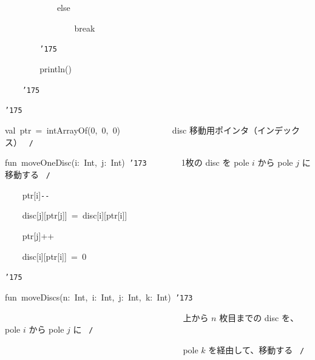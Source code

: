 \documentclass{article}
\begin{document}
\noindent
\mbox{}{\tt\mc \ \ \ \ \ \ \ \ \ \ \ \ }else

\noindent
\mbox{}{\tt\mc \ \ \ \ \ \ \ \ \ \ \ \ \ \ \ \ }break

\noindent
\mbox{}{\tt\mc \ \ \ \ \ \ \ \ }{\tt\char'175}

\noindent
\mbox{}{\tt\mc \ \ \ \ \ \ \ \ }println()

\noindent
\mbox{}{\tt\mc \ \ \ \ }{\tt\char'175}

\noindent
\mbox{}{\tt\char'175}

\noindent
\mbox{}\hfill

\noindent
\mbox{}val{\tt\mc \ }ptr{\tt\mc \ }={\tt\mc \ }intArrayOf(0,{\tt\mc \ }0,{\tt\mc \ }0){\tt\mc \ \ \ }{\tt\mc \ \ \ \ \ \ \ \ }\rm\mc {\tt /}{\tt *}\  {}disc 移動用ポインタ（インデックス）
					   \hfill \rm\mc \ {\tt *}{\tt /}
\tt\mc 

\noindent
\mbox{}\hfill

\noindent
\mbox{}fun{\tt\mc \ }moveOneDisc(i:{\tt\mc \ }Int,{\tt\mc \ }j:{\tt\mc \ }Int){\tt\mc \ }{\tt\char'173}{\tt\mc \ \ \ \ \ \ \ }\rm\mc {\tt /}{\tt *}\  {}1枚の disc を pole $i$ から
					   pole $j$ に移動する \hfill \rm\mc \ {\tt *}{\tt /}
\tt\mc 

\noindent
\mbox{}{\tt\mc \ \ \ \ }ptr[i]{\tt -}{\tt -}

\noindent
\mbox{}{\tt\mc \ \ \ \ }disc[j][ptr[j]]{\tt\mc \ }={\tt\mc \ }disc[i][ptr[i]]

\noindent
\mbox{}{\tt\mc \ \ \ \ }ptr[j]++

\noindent
\mbox{}{\tt\mc \ \ \ \ }disc[i][ptr[i]]{\tt\mc \ }={\tt\mc \ }0

\noindent
\mbox{}{\tt\char'175}

\noindent
\mbox{}\hfill

\noindent
\mbox{}fun{\tt\mc \ }moveDiscs(n:{\tt\mc \ }Int,{\tt\mc \ }i:{\tt\mc \ }Int,{\tt\mc \ }j:{\tt\mc \ }Int,{\tt\mc \ }k:{\tt\mc \ }Int){\tt\mc \ }{\tt\char'173}

\noindent
\mbox{}{\tt\mc \ \ \ \ \ \ \ \ }{\tt\mc \ \ \ \ \ \ \ \ }{\tt\mc \ \ \ \ \ \ \ \ }{\tt\mc \ \ \ \ \ \ \ \ }{\tt\mc \ \ \ \ \ \ \ \ }\rm\mc {\tt /}{\tt *}\  {}上から $n$ 枚目までの disc
					   を、pole $i$ から pole $j$ に
					   \hfill \rm\mc \ {\tt *}{\tt /}
\tt\mc 

\noindent
\mbox{}{\tt\mc \ \ \ \ \ \ \ \ }{\tt\mc \ \ \ \ \ \ \ \ }{\tt\mc \ \ \ \ \ \ \ \ }{\tt\mc \ \ \ \ \ \ \ \ }{\tt\mc \ \ \ \ \ \ \ \ }\rm\mc {\tt /}{\tt *}\  {}pole $k$ を経由して、移動する
					   \hfill \rm\mc \ {\tt *}{\tt /}
\tt\mc 
\end{document}
